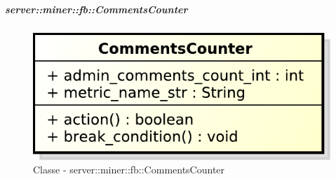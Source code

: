 	\subparagraph{server::miner::fb::CommentsCounter} %
		\label{subp:server_miner_fb_CommentsCounter}
		    \begin{figure}[!htbp]
 		 		\centering
 				\centerline{\includegraphics[scale=0.75]{./images/server/classes/miner/comments_counter.pdf}}
 				\caption{Classe - server::miner::fb::CommentsCounter}
			\end{figure}
